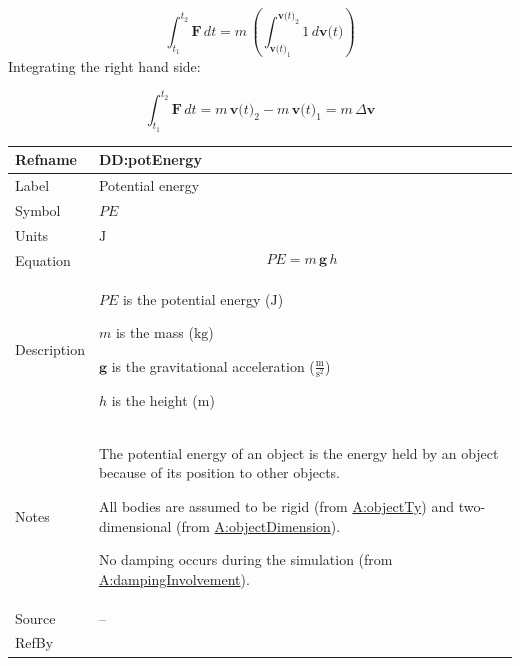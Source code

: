 \documentclass[12pt]{article}
\begin{document}
\begin{displaymath}
\int_{{t_{1}}}^{{t_{2}}}{\symbf{F}}\,dt=m\,\left(\int_{{\symbf{v}\text{(}t\text{)}_{1}}}^{{\symbf{v}\text{(}t\text{)}_{2}}}{1}\,d\symbf{v}\text{(}t\text{)}\right)
\end{displaymath}
Integrating the right hand side:

\begin{displaymath}
\int_{{t_{1}}}^{{t_{2}}}{\symbf{F}}\,dt=m\,{\symbf{v}\text{(}t\text{)}_{2}}-m\,{\symbf{v}\text{(}t\text{)}_{1}}=m\,Δ\symbf{v}
\end{displaymath}
\medskip
\noindent
\begin{minipage}{\textwidth}
\begin{tabular}{>{\raggedright}p{}>{\raggedright\arraybackslash}p{}}
\toprule \textbf{Refname} & \textbf{DD:potEnergy}
\label{DD:potEnergy}
\\ \midrule
Label & Potential energy
        
\\ \midrule
Symbol & $PE$
         
\\ \midrule
Units & ${\text{J}}$
        
\\ \midrule
Equation & \begin{displaymath}
           PE=m\,\symbf{g}\,h
           \end{displaymath}
\\ \midrule
Description & \begin{symbDescription}
              \item{$PE$ is the potential energy (${\text{J}}$)}
              \item{$m$ is the mass (${\text{kg}}$)}
              \item{$\symbf{g}$ is the gravitational acceleration ($\frac{\text{m}}{\text{s}^{2}}$)}
              \item{$h$ is the height (${\text{m}}$)}
              \end{symbDescription}
\\ \midrule
Notes & The potential energy of an object is the energy held by an object because of its position to other objects.
        
        All bodies are assumed to be rigid (from \hyperref[assumpOT]{A:objectTy}) and two-dimensional (from \hyperref[assumpOD]{A:objectDimension}).
        
        No damping occurs during the simulation (from \hyperref[assumpDI]{A:dampingInvolvement}).
        
\\ \midrule
Source & --
         
\\ \midrule
RefBy & 
\\ \bottomrule
\end{tabular}
\end{minipage}
\end{document}

